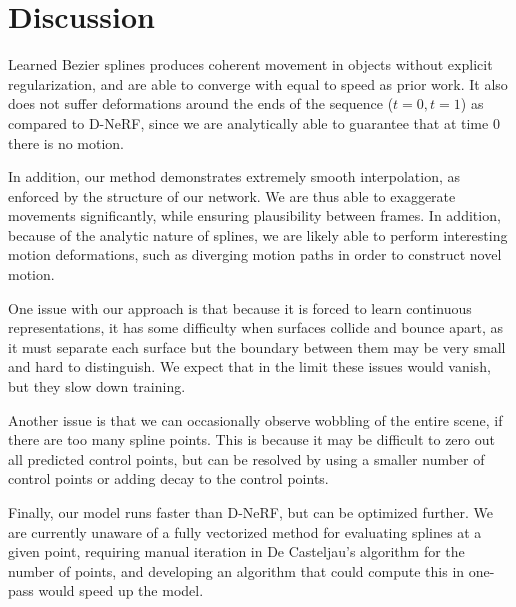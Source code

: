 \section*{Discussion}

Learned Bezier splines produces coherent movement in objects without explicit regularization, and are able to
converge with equal to speed as prior work. It also does not suffer deformations around the ends of the sequence ($t=0, t=1$) as compared to D-NeRF, since we are analytically able to guarantee that at time 0 there is no motion. 

In addition, our method demonstrates extremely smooth interpolation, as enforced by the structure of our network.
We are thus able to exaggerate movements significantly, while ensuring plausibility between frames. In addition, because of the analytic nature
of splines, we are likely able to perform interesting motion deformations, such as diverging motion paths in order to construct novel motion.

One issue with our approach is that because it is forced to learn continuous representations, it has some difficulty when surfaces collide and bounce apart, as it must separate each surface but the boundary between them may be very small and hard to distinguish. We expect that in the limit these issues would vanish, but they slow down training.

Another issue is that we can occasionally observe wobbling of the entire scene, if there are too many spline points. This is because it may be difficult to zero out all predicted control points, but can be resolved by using a smaller number of control points or adding decay to the control points.

Finally, our model runs faster than D-NeRF, but can be optimized further. We are currently unaware of a fully vectorized method for evaluating splines at a given point, requiring manual iteration in De Casteljau's algorithm for the number of points, and developing an algorithm that could compute this in one-pass would speed up the model.